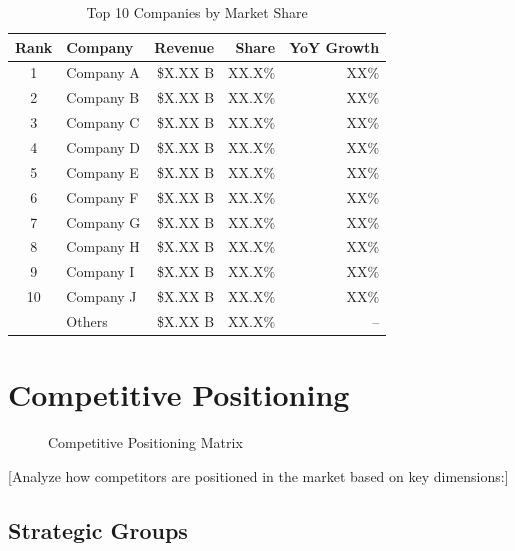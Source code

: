 \documentclass[11pt,letterpaper]{report}
\begin{document}
\begin{table}[htbp]
\centering
\caption{Top 10 Companies by Market Share}
\begin{tabular}{@{}clrrr@{}}
\toprule
\textbf{Rank} & \textbf{Company} & \textbf{Revenue} & \textbf{Share} & \textbf{YoY Growth} \\
\midrule
1 & Company A & \$X.XX B & XX.X\% & \trendup{} XX\% \\
\rowcolor{tablealt} 2 & Company B & \$X.XX B & XX.X\% & \trendup{} XX\% \\
3 & Company C & \$X.XX B & XX.X\% & \trendflat{} XX\% \\
\rowcolor{tablealt} 4 & Company D & \$X.XX B & XX.X\% & \trendup{} XX\% \\
5 & Company E & \$X.XX B & XX.X\% & \trenddown{} XX\% \\
\rowcolor{tablealt} 6 & Company F & \$X.XX B & XX.X\% & \trendup{} XX\% \\
7 & Company G & \$X.XX B & XX.X\% & \trendup{} XX\% \\
\rowcolor{tablealt} 8 & Company H & \$X.XX B & XX.X\% & \trendflat{} XX\% \\
9 & Company I & \$X.XX B & XX.X\% & \trendup{} XX\% \\
\rowcolor{tablealt} 10 & Company J & \$X.XX B & XX.X\% & \trenddown{} XX\% \\
\midrule
& Others & \$X.XX B & XX.X\% & -- \\
\bottomrule
\end{tabular}
\label{tab:market_share}
\end{table}

\section{Competitive Positioning}


\begin{figure}[htbp]
\centering
\caption{Competitive Positioning Matrix}
\label{fig:competitive_positioning}
\end{figure}

[Analyze how competitors are positioned in the market based on key dimensions:]

\subsection{Strategic Groups}
\end{document}
